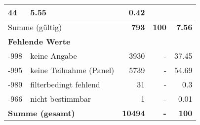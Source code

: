 \begin{longtable}{lXrrr}
       \num{44} &
       \num[round-mode=places,round-precision=2]{5.55} &
         \num[round-mode=places,round-precision=2]{0.42} \\
     \midrule
     \multicolumn{2}{l}{Summe (gültig)} &
       \textbf{\num{793}} &
     \textbf{\num{100}} &
       \textbf{\num[round-mode=places,round-precision=2]{7.56}} \\
     \multicolumn{5}{l}{\textbf{Fehlende Werte}}\\
       -998 &
       keine Angabe &
         \num{3930} &
        - &
         \num[round-mode=places,round-precision=2]{37.45} \\
       -995 &
       keine Teilnahme (Panel) &
         \num{5739} &
        - &
         \num[round-mode=places,round-precision=2]{54.69} \\
       -989 &
       filterbedingt fehlend &
         \num{31} &
        - &
         \num[round-mode=places,round-precision=2]{0.3} \\
       -966 &
       nicht bestimmbar &
         \num{1} &
        - &
         \num[round-mode=places,round-precision=2]{0.01} \\
     \midrule
     \multicolumn{2}{l}{\textbf{Summe (gesamt)}} &
          \textbf{\num{10494}} &
        \textbf{-} &
        \textbf{\num{100}} \\
     \bottomrule
     \end{longtable}
     
